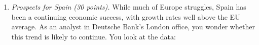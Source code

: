 \documentclass[letterpaper,12pt]{article}
\begin{document}
\begin{enumerate}
\begin{comment}
\item Draw a diagram with AS, AD, and AS$^*$.
Assume for the time being that we start at a long-run equilibrium
(where AS crosses AD and AS$^*$ at the same time). (i)~AD shifts
right/up. In the short run, we move to where AS and AD cross (and
ignore AS$^*$). This raises output and prices (inflation). (ii)~In
the long-run, AS also shifts, to the point where AD and AS$^*$
cross. Why? Because the sticky wages eventually adjust. The result:
prices rise, but output stays the same, relative to our starting
point. This illustrates the difference between the short-run and
long-run effects of monetary policy:  In the long run, all we get is
inflation.  In the short-run, we get a combination of higher prices
and higher output. Which sends us back to (a):  one of the questions
the Fed must address is how large the short-run increase in output
is.  That, in turn, depends on how steep the AS curve is:  the
steeper the curve, the smaller the increase in output. [For
practice, contrast this analysis with one where we start to the left
of AS$^*$.]
%
(iii)~If you review our earlier answer, you'll see that the long-run
impact depends on where the short-term equilibrium is relative to
AS$^*$. This statement suggests that the FOMC sees the economy as
close to AS$^*$.

\item If inflation rises, the Fed would typically raise
the target fed funds rate. You can see this in the Taylor rule, for
example. This also brings us back to (a), since ultimately the FOMC
policy will depend on both inflation and output news.

\end{enumerate}
\end{comment}

\item {\it Prospects for Spain (30 points).\/} 
While much of Europe struggles, Spain has been a continuing economic 
success, with growth rates well above the EU average.  
As an analyst in Deutsche Bank's London office, 
you wonder whether this trend is likely to continue.  
You look at the data:  


\end{enumerate}
\end{document}
